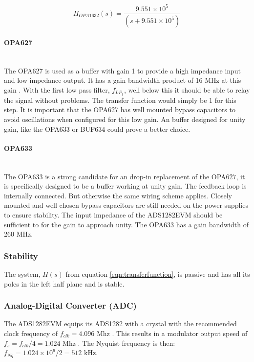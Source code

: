 \documentclass[a4paper]{article}
\begin{document}
\begin{equation}
  H_{OPA1632}(s) = \frac{9.551 \times 10^5}
                        {(s + 9.551 \times 10^5)}
  \label{eqn:opa1632_tf}
\end{equation}

\paragraph{OPA627} \ \\
The OPA627 is used as a buffer with gain 1 to provide a high impedance input and low
impedance output. It has a gain bandwidth product of 16 MHz at this
gain \cite{opa627_ds}. With the first low pass filter, $f_{LP_1}$, well
below this it should be able to relay the signal without problems. The
transfer function would simply be 1 for this step. It is important that
the OPA627 has well mounted bypass capacitors to avoid oscillations when
configured for this low gain. An buffer designed for unity gain, like
the OPA633 \cite{opa633_ds} or BUF634 \cite{buf634_ds} could prove a better choice.

\paragraph{OPA633} \ \\
The OPA633 \cite{opa633_ds} is a strong candidate for an drop-in replacement of the
OPA627, it is specifically designed to be a buffer working at unity
gain. The feedback loop is internally connected. But otherwise the same
wiring scheme applies. Closely mounted and well chosen bypass capacitors
are still needed on the power supplies to ensure stability. The input
impedance of the ADS1282EVM should be sufficient to for the gain to
approach unity. The OPA633 has a gain bandwidth of 260 MHz.

\subsubsection{Stability}
The system, $H(s)$ from equation \eqref{eqn:transferfunction}, is
passive and has all
its poles in the left half plane and is stable.

\subsubsection{Analog-Digital Converter (ADC)}
The ADS1282EVM equips its ADS1282 with a crystal with the recommended clock frequency of
$f_{clk} = 4.096$ Mhz \cite{ads1282evm_ds}. This results in a modulator
output speed of $ f_s = f_{clk}/4 = 1.024$ Mhz \cite{ads1282_ds}. The
Nyquist frequency is then: $f_{Nq} = 1.024 \times 10^6 / 2 = 512 $ kHz.
\end{document}
